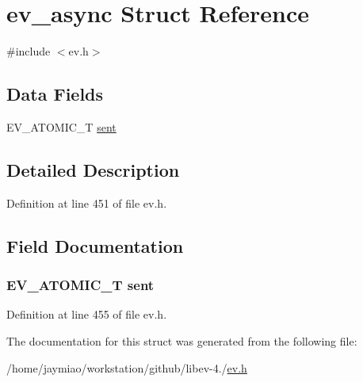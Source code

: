 \hypertarget{structev__async}{\section{ev\-\_\-async \-Struct \-Reference}
\label{structev__async}
}


{\ttfamily \#include $<$ev.\-h$>$}

\subsection*{\-Data \-Fields}
\begin{DoxyCompactItemize}
\item 
\-E\-V\-\_\-\-A\-T\-O\-M\-I\-C\-\_\-\-T \hyperlink{structev__async_a52c67fd03d9b7f249d27026d864d6192}{sent}
\end{DoxyCompactItemize}


\subsection{\-Detailed \-Description}


\-Definition at line 451 of file ev.\-h.



\subsection{\-Field \-Documentation}
\hypertarget{structev__async_a52c67fd03d9b7f249d27026d864d6192}{
\subsubsection[{sent}]{\setlength{\rightskip}{0pt plus 5cm}\-E\-V\-\_\-\-A\-T\-O\-M\-I\-C\-\_\-\-T {\bf sent}}}\label{structev__async_a52c67fd03d9b7f249d27026d864d6192}


\-Definition at line 455 of file ev.\-h.



\-The documentation for this struct was generated from the following file\-:\begin{DoxyCompactItemize}
\item 
/home/jaymiao/workstation/github/libev-\/4./\hyperlink{ev_8h}{ev.\-h}\end{DoxyCompactItemize}
